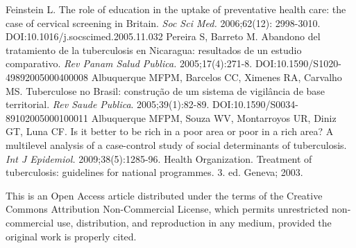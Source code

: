 \begin{multicols}{2}
\begin{biblio}[REFERENCES]
\allowbreak{} Feinstein L.\allowbreak{} The role of education in the uptake of preventative health care:\allowbreak{} the case of cervical screening in Britain.\allowbreak{} \textit{Soc Sci Med.\allowbreak{} }2006;62(\allowbreak{}12)\allowbreak{}:\allowbreak{} 2998-\allowbreak{}3010.\allowbreak{} DOI:\allowbreak{}10.\allowbreak{}1016\fshyp{}j.\allowbreak{}socscimed.\allowbreak{}2005.\allowbreak{}11.\allowbreak{}032
\allowbreak{} Pereira S,\allowbreak{} Barreto M.\allowbreak{} Abandono del tratamiento de la tuberculosis en Nicaragua:\allowbreak{} resultados de un estudio comparativo.\allowbreak{} \textit{Rev Panam Salud Publica.\allowbreak{} }2005;17(\allowbreak{}4)\allowbreak{}:\allowbreak{}271-\allowbreak{}8.\allowbreak{} DOI:\allowbreak{}10.\allowbreak{}1590\fshyp{}S1020-\allowbreak{}49892005000400008
\allowbreak{} Albuquerque MFPM,\allowbreak{} Barcelos CC,\allowbreak{} Ximenes RA,\allowbreak{} Carvalho MS.\allowbreak{} Tuberculose no Brasil:\allowbreak{} construção de um sistema de vigilância de base territorial.\allowbreak{} \textit{Rev Saude Publica}.\allowbreak{} 2005;39(\allowbreak{}1)\allowbreak{}:\allowbreak{}82-\allowbreak{}89.\allowbreak{} DOI:\allowbreak{}10.\allowbreak{}1590\fshyp{}S0034-\allowbreak{}89102005000100011
\allowbreak{} Albuquerque MFPM,\allowbreak{} Souza WV,\allowbreak{} Montarroyos UR,\allowbreak{} Diniz GT,\allowbreak{} Luna CF.\allowbreak{} Is it better to be rich in a poor area or poor in a rich area? A multilevel analysis of a case-\allowbreak{}control study of social determinants of tuberculosis.\allowbreak{} \textit{Int J Epidemiol.\allowbreak{}} 2009;38(\allowbreak{}5)\allowbreak{}:\allowbreak{}1285-\allowbreak{}96.\allowbreak{}
Health Organization.\allowbreak{} Treatment of tuberculosis:\allowbreak{} guidelines for national programmes.\allowbreak{} 3.\allowbreak{} ed.\allowbreak{} Geneva; 2003.\allowbreak{}
\end{biblio}

\medskip\par\noindent
\footnotesize{This is an Open Access article distributed under the terms of the Creative Commons Attribution Non-Commercial License, which permits unrestricted non-commercial use, distribution, and reproduction in any medium, provided the original work is properly cited.}
\end{multicols}

